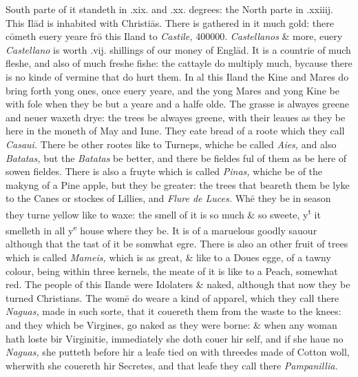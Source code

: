 \documentclass[11pt,twoside]{article}\makeatletter
\begin{document}
 South parte of it standeth in .xix. and .xx. degrees: the North parte in .xxiiij. This Ilād is inhabited with Christiās. There is gathered in it much gold: there cōmeth euery yeare frō this Iland to {\itshape Castile,} 400000. {\itshape Castellanos} \& more, euery {\itshape Castellano} is worth .vij. shillings of our money of Englād. It is a coun­trie of much fleshe, and also of much freshe fishe: the cattayle do multiply much, bycause there is no kinde of vermine that do hurt them. In al this Iland the Kine and Mares do bring forth yong ones, once euery yeare, and the yong Mares and 
	\normalmarginpar
       yong Kine be with fole when they be but a yeare and a halfe olde. The grasse is alwayes greene and neuer waxeth drye: the trees be alwayes greene, with their leaues as they be here in the moneth of May and Iune. They eate bread of a roote which they call {\itshape Casaui.} There be other rootes like to Turneps, whiche be called {\itshape Aies,} and also {\itshape Batatas,} but the {\itshape Batatas} be bet­ter, and there be fieldes ful of them as be here of sowen fieldes. There is also a fruyte which is called {\itshape Pinas,} whiche be of the makyng of a Pine apple, but they be greater: the trees that beareth them be lyke to the Canes or stockes of Lillies, and {\itshape Flure de Luces.} Whē they be in season they turne yellow like to waxe: the smell of it is so much \& so sweete, y\textsuperscript{t} it smelleth in all y\textsuperscript{e} house where they be. It is of a maruelous goodly sauour although that the tast of it be somwhat egre. There is also an other fruit of trees which is called {\itshape Mameis,} which is as great, \& like to a Doues egge, of a tawny colour, being within three kernels, the meate of it is like to a Peach, somewhat red. The people of this Ilande were Idolaters \& naked, although that now they be turned Christians. The womē do weare a kind of apparel, which they call there {\itshape Naguas,} made in such sorte, that it couereth them from the waste to the knees: and they which be Virgines, go naked as they were borne: \& when any woman hath loste bir Virginitie, immediately she doth couer hir self, and if she haue no {\itshape Naguas,} she putteth before hir a leafe tied on with threedes made of Cotton woll, wherwith she co­uereth hir Secretes, and that leafe they call there {\itshape Pampanillia.} %
\end{document}
